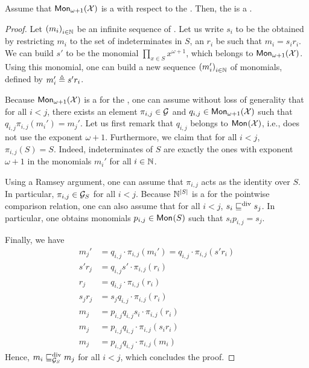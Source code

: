 \begin{lemma}
    \label{def:wqo-g-implies-g-s}
    Assume that $\mon[\omega+1]{\X}$ is a  with respect to
    the . Then, the  is a .
\end{lemma}
\begin{proof}

    Let $\seqof{m_i}[i \in \N]$ be an infinite sequence of . Let
    us write $s_i$ to be the  obtained by restricting $m_i$ to the
    set of indeterminates in $S$, an $r_i$ be such that $m_i = s_i r_i$. We can
    build $s'$ to be the monomial $\prod_{x \in S} x^{\omega+1}$, which belongs
    to $\mon[\omega+1]{\X}$. Using this monomial, one can build a new sequence
    $\seqof{m_i'}[i \in \N]$ of monomials, defined by $m_i' \defined s' r_i$.

    Because $\mon[\omega+1]{\X}$ is a  for the
    , one can assume without loss of generality
    that for all $i < j$, there exists an element $\pi_{i,j} \in \group$ and
    $q_{i,j} \in \mon[\omega+1]{\X}$ such that $q_{i,j} \pi_{i,j}(m_i') =
    m_j'$. Let us first remark that $q_{i,j}$ belongs to $\mon{\X}$, i.e., does
    not use the exponent $\omega+1$. Furthermore, we claim that for all $i <
    j$, $\pi_{i,j}(S) = S$. Indeed, indeterminates of $S$ are exactly the ones
    with exponent $\omega+1$ in the monomials $m_i'$ for all $i \in \N$.

    Using a Ramsey argument, one can assume that $\pi_{i,j}$ acts as the
    identity over $S$. In particular, $\pi_{i,j} \in \group_S$ for all $i < j$.
    Because $\N^{|S|}$ is a  for the pointwise
    comparison relation, one can also assume that for all $i < j$, $s_i \divleq
    s_j$. In particular, one obtains monomials $p_{i,j} \in \mon{S}$ such that
    $s_i p_{i,j} = s_j$.

    Finally, we have 
    \begin{align*}
        m_j'      &= q_{i,j} \cdot \pi_{i,j}(m_i')
                  = q_{i,j} \cdot \pi_{i,j}(s' r_i) \\
        s' r_j    &= q_{i,j} s' \cdot \pi_{i,j}(r_i) \\
        r_j    &= q_{i,j} \cdot \pi_{i,j}(r_i) \\
        s_j r_j    &= s_j q_{i,j} \cdot \pi_{i,j}(r_i) \\
        m_j    &= p_{i,j} q_{i,j} s_i \cdot \pi_{i,j}(r_i) \\
        m_j    &= p_{i,j} q_{i,j} \cdot \pi_{i,j}(s_i r_i) \\
        m_j    &= p_{i,j} q_{i,j} \cdot \pi_{i,j}(m_i) 
    \end{align*}
    Hence, $m_i \gdivleq[\group_S] m_j$ for all $i < j$, which concludes the proof.
\end{proof}

